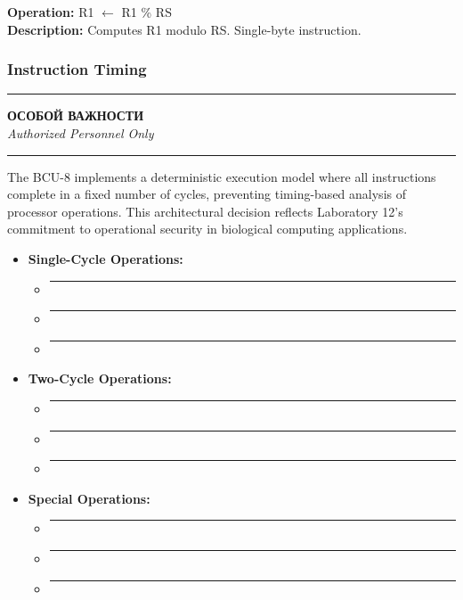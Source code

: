 \documentclass[12pt]{article}
\begin{document}
\textbf{Operation:} R1 $\leftarrow$ R1 \% RS\\
\textbf{Description:} Computes R1 modulo RS. Single-byte instruction.

\subsubsection{Instruction Timing}
\begin{center}
\textcolor{sovietred}{\rule{0.8\textwidth}{0.4pt}}

\textbf{\foreignlanguage{russian}{ОСОБОЙ ВАЖНОСТИ}}\\
\textit{Authorized Personnel Only}

\rule{0.8\textwidth}{0.4pt}
\end{center}

The BCU-8 implements a deterministic execution model where all instructions complete in a fixed number of cycles, preventing timing-based analysis of processor operations. This architectural decision reflects Laboratory 12's commitment to operational security in biological computing applications.

\begin{itemize}
    \item \textbf{Single-Cycle Operations:}
        \begin{itemize}
            \item \rule{45mm}{3.5mm}
            \item \rule{45mm}{3.5mm}
            \item \rule{45mm}{3.5mm}
        \end{itemize}
    \item \textbf{Two-Cycle Operations:}
        \begin{itemize}
            \item \rule{45mm}{3.5mm}
            \item \rule{45mm}{3.5mm}
            \item \rule{45mm}{3.5mm}
        \end{itemize}
    \item \textbf{Special Operations:}
        \begin{itemize}
            \item \rule{75mm}{3.5mm}
            \item \rule{75mm}{3.5mm}
            \item \rule{75mm}{3.5mm}
        \end{itemize}
\end{itemize}
\end{document}
